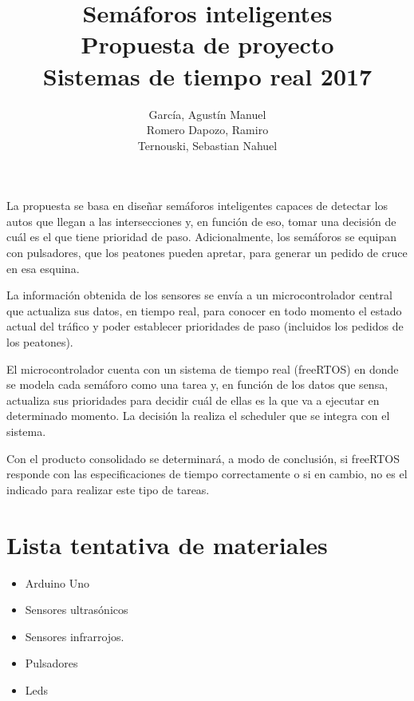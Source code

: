 \documentclass[a4paper,11pt]{article}
\title{Semáforos inteligentes
		\\{\large Propuesta de proyecto\\ Sistemas de tiempo real 2017}}
\author{García, Agustín Manuel
\\Romero Dapozo, Ramiro
\\Ternouski, Sebastian Nahuel}
\date{}
\begin{document}
\maketitle

La propuesta se basa en diseñar semáforos inteligentes capaces de detectar los autos que llegan a las intersecciones y, en función de eso, tomar una decisión de cuál es el que tiene prioridad de paso. Adicionalmente, los semáforos se equipan con pulsadores, que los peatones pueden apretar, para generar un pedido de cruce en esa esquina.

La información obtenida de los sensores se envía a un microcontrolador central que actualiza sus datos, en tiempo real, para conocer en todo momento el estado actual del tráfico y poder establecer prioridades de paso (incluidos los pedidos de los peatones).

El microcontrolador cuenta con un sistema de tiempo real (freeRTOS) en donde se modela cada semáforo como una tarea y, en función de los datos que sensa, actualiza sus prioridades para decidir cuál de ellas es la que va a ejecutar en determinado momento. La decisión la realiza el scheduler que se integra con el sistema.

Con el producto consolidado se determinará, a modo de conclusión, si freeRTOS responde con las especificaciones de tiempo correctamente o si en cambio, no es el indicado para realizar este tipo de tareas.

\section*{Lista tentativa de materiales}
\begin{itemize}
	\item Arduino Uno
	\item Sensores ultrasónicos
	\item Sensores infrarrojos.
	\item Pulsadores
	\item Leds
\end{itemize}
\end{document}
